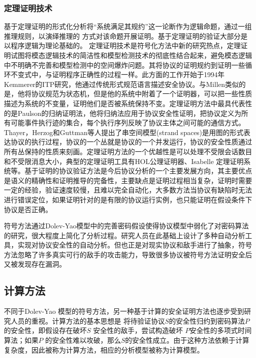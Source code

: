 \subsubsection{定理证明技术}
基于定理证明的形式化分析将“系统满足其规约”这一论断作为逻辑命题，通过一组推理规则，以演绎推理的
方式对该命题开展证明。基于定理证明的验证大部分是以程序逻辑为理论基础的。
定理证明技术是符号化方法中新的研究热点，定理证明试图将模态逻辑技术的简洁性和模型检测技术的彻底性结合起来，避免模态逻辑中不明确不完善和模型检测中的空间爆炸问题。其将协议的证明规约到证明一些循环不变式中，与证明程序正确性的过程一样。此方面的工作开始于1994年Kemmerer的ITP研究，他通过传统形式规范语言描述安全协议。与Millen\cite{1702206}类似的是，他将协议规范为状态机，但是他的系统中附着了一个证明器，可以把一些性质描述为系统的不变量，证明他们是否被系统保持不变。定理证明方法中最具代表性的是Paulson的归纳证明法\cite{Paulson1997a}，他将归纳法应用于协议安全性证明，把协议定义为所有可能事件执行迹的集合，每个执行序列反映了协议主体之间可能的通信方式。Thayer，Herzog和Guttman等人提出了串空间模型(strand spaces)\cite{Fabrega1999}是用图的形式表达协议的执行过程，协议的一个丛就是协议的一个并发运行，协议的安全性质通过所有丛保持的性质来刻画。定理证明方法的一个优越性是可以处理不受限会话数目和不受限消息大小，典型的定理证明工具有HOL公理证明器\cite{Brackin1998}、Isabelle 定理证明系统\cite{Bella1997}等。基于证明的协议验证方法是今后协议分析的一个主要发展方向，其主要优点是语义的精确性和证明推导的完备性，主要缺点是证明过程相当复杂，证明时需要一定的经验，验证速度较慢，且难以完全自动化，大多数方法当协议有缺陷时无法进行错误定位，如果证明针对的是有限的协议运行实例，也只能证明在假设条件下协议是否正确。

符号方法通过Dolev-Yao模型中的完善密码假设使得协议模型中弱化了对密码算法的研究，很大程度上简化了分析过程。研究人员在此基础上设计了多种自动分析工具，实现对协议安全性的自动分析。但也正是对现实协议和敌手进行了抽象，符号方法忽略了许多真实可行的敌手的攻击能力，导致很多协议被符号方法证明安全后又被发现存在漏洞。



\subsection{计算方法}
不同于Dolev-Yao 模型的符号方法，另一种基于计算的安全证明方法也逐步受到研究人员的重视。计算方法的基本思想是
将待验证协议$S$的安全性归约到密码算法$P$的安全性，即假设存在破坏$S$
安全性的敌手，尝试构造破坏 $P$安全性的多项式时间算法；如果$P$
的安全性难以攻破，那么$S$的安全性成立。由于这种方法依赖于计算
复杂度，因此被称为计算方法，相应的分析模型被称为计算模型。

